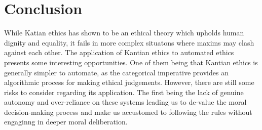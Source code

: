 \documentclass{article}
\begin{document}
\section{Conclusion}
While Katian ethics has shown to be an ethical theory which upholds human dignity and equality,
it fails in more complex situatons where maxims may clash against each other. The application
of Kantian ethics to automated ethics presents some interesting opportunities. One of them 
being that Kantian ethics is generally simpler to automate, as the categorical imperative provides
an algorithmic process for making ethical judgements. However, there are still some risks to consider
regarding its application. The first being the lack of genuine autonomy and over-reliance on these systems
leading us to de-value the moral decision-making process and make us accustomed to following the rules without
engaginng in deeper moral deliberation.

\printbibliography[title={References}]
\end{document}
